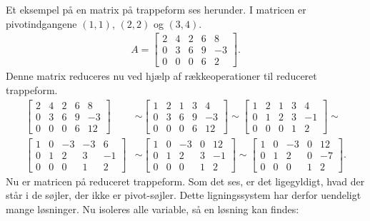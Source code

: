 \begin{eks}
Et eksempel på en matrix på trappeform ses herunder. I matricen er pivotindgangene $(1,1)$, $(2,2)$ og $(3,4)$.
\begin{align*}
A= \begin{bmatrix}
2 & 4 & 2 & 6 & 8 \\
0 & 3 & 6 & 9 & -3 \\
0 & 0 & 0 & 6 & 2
\end{bmatrix}. 
\end{align*}
Denne matrix reduceres nu ved hjælp af rækkeoperationer til reduceret trappeform.\\
\begin{align*}
\begin{bmatrix}
2 & 4 & 2 & 6 & 8 \\
0 & 3 & 6 & 9 & -3 \\
0 & 0 & 0 & 6 & 12
\end{bmatrix}
&\sim
\begin{bmatrix}
1 & 2 & 1 & 3 & 4 \\
0 & 3 & 6 & 9 & -3 \\
0 & 0 & 0 & 6 & 12
\end{bmatrix}
\sim
\begin{bmatrix}
1 & 2 & 1 & 3 & 4 \\
0 & 1 & 2 & 3 & -1 \\
0 & 0 & 0 & 1 & 2
\end{bmatrix}
\sim \\
\begin{bmatrix}
1 & 0 & -3 & -3 & 6 \\
0 & 1 & 2 & 3 & -1 \\
0 & 0 & 0 & 1 & 2
\end{bmatrix}
&\sim
\begin{bmatrix}
1 & 0 & -3 & 0 & 12 \\
0 & 1 & 2 & 3 & -1 \\
0 & 0 & 0 & 1 & 2
\end{bmatrix}
\sim
\begin{bmatrix}
1 & 0 & -3 & 0 & 12 \\
0 & 1 & 2 & 0 & -7 \\
0 & 0 & 0 & 1 & 2
\end{bmatrix}.
\end{align*}
Nu er matricen på reduceret trappeform. Som det ses, er det ligegyldigt, hvad der står i de søjler, der ikke er pivot-søjler. Dette ligningssystem har derfor uendeligt mange løsninger. Nu isoleres alle variable, så en løsning kan findes:
\begin{align*}

\end{align*}
\end{eks}
